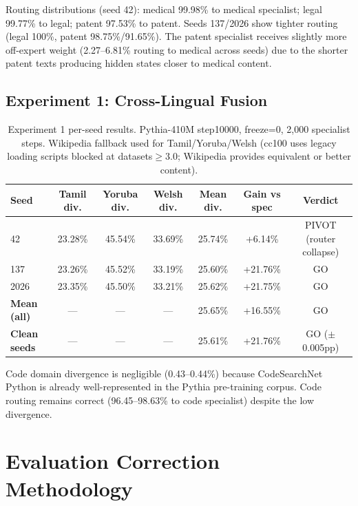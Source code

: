 \documentclass{article}
\begin{document}
Routing distributions (seed 42): medical 99.98\% to medical specialist; legal 99.77\% to legal; patent 97.53\% to patent. Seeds 137/2026 show tighter routing (legal 100\%, patent 98.75\%/91.65\%). The patent specialist receives slightly more off-expert weight (2.27--6.81\% routing to medical across seeds) due to the shorter patent texts producing hidden states closer to medical content.

\subsection{Experiment 1: Cross-Lingual Fusion}
\label{app:phase2_crosslingual}

\begin{table}[h]
\centering
\caption{Experiment 1 per-seed results. Pythia-410M step10000, freeze=0, 2,000 specialist steps. Wikipedia fallback used for Tamil/Yoruba/Welsh (cc100 uses legacy loading scripts blocked at datasets$\geq$3.0; Wikipedia provides equivalent or better content).}
\label{tab:app_phase2_crosslingual}
\begin{tabular}{lcccccc}
\toprule
\textbf{Seed} & \textbf{Tamil div.} & \textbf{Yoruba div.} & \textbf{Welsh div.} & \textbf{Mean div.} & \textbf{Gain vs spec} & \textbf{Verdict} \\
\midrule
42   & 23.28\% & 45.54\% & 33.69\% & 25.74\% & +6.14\%  & PIVOT (router collapse) \\
137  & 23.26\% & 45.52\% & 33.19\% & 25.60\% & +21.76\% & GO \\
2026 & 23.35\% & 45.50\% & 33.21\% & 25.62\% & +21.75\% & GO \\
\midrule
\textbf{Mean (all)} & --- & --- & --- & 25.65\% & +16.55\% & GO \\
\textbf{Clean seeds} & --- & --- & --- & 25.61\% & +21.76\% & GO ($\pm$0.005pp) \\
\bottomrule
\end{tabular}
\end{table}

Code domain divergence is negligible (0.43--0.44\%) because CodeSearchNet Python is already well-represented in the Pythia pre-training corpus. Code routing remains correct (96.45--98.63\% to code specialist) despite the low divergence.

\section{Evaluation Correction Methodology}
\label{app:evalcorrection}
\end{document}

